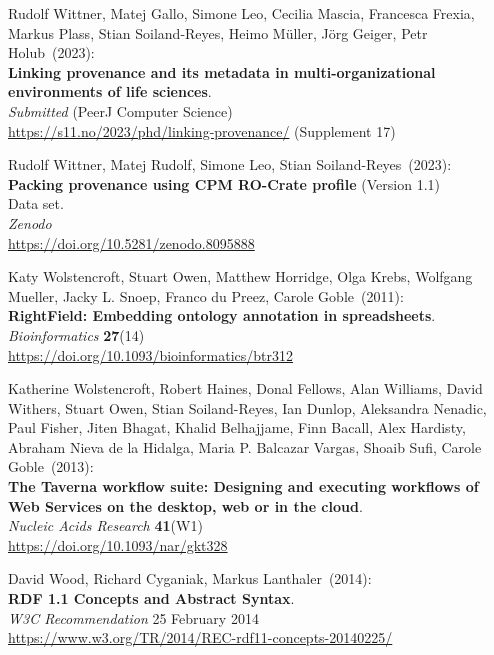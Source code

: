 \begin{thebibliography}{9}
Rudolf Wittner, Matej Gallo, Simone Leo, Cecilia Mascia, Francesca Frexia, Markus Plass, Stian Soiland-Reyes, Heimo Müller, Jörg Geiger, Petr Holub~(2023): \\
\textbf{Linking provenance and its metadata in multi-organizational environments of life sciences}.\\
\emph{Submitted} (PeerJ Computer Science)\\
\url{https://s11.no/2023/phd/linking-provenance/}
(Supplement 17)

Rudolf Wittner, Matej Rudolf, Simone Leo, Stian Soiland-Reyes~(2023): \\
\textbf{Packing provenance using CPM RO-Crate profile} (Version 1.1)\\
Data set.\\
\emph{Zenodo}\\
\url{https://doi.org/10.5281/zenodo.8095888}

Katy Wolstencroft, Stuart Owen, Matthew Horridge, Olga Krebs, Wolfgang Mueller, Jacky L. Snoep, Franco du Preez, Carole Goble~(2011): \\
\textbf{RightField: Embedding ontology annotation in spreadsheets}. \\
\emph{Bioinformatics} \textbf{27}(14) \\
\url{https://doi.org/10.1093/bioinformatics/btr312}

Katherine Wolstencroft, Robert Haines, Donal Fellows, Alan Williams, David Withers, Stuart Owen, Stian Soiland-Reyes, Ian Dunlop, Aleksandra Nenadic, Paul Fisher, Jiten Bhagat, Khalid Belhajjame, Finn Bacall, Alex Hardisty, Abraham Nieva de la Hidalga, Maria P. Balcazar Vargas, Shoaib Sufi, Carole Goble~(2013): \\
\textbf{The {Taverna} workflow suite: Designing
and executing workflows of {Web Services} on the desktop, web or in the
cloud}. \\
\emph{Nucleic Acids Research} \textbf{41}(W1) \\
\url{https://doi.org/10.1093/nar/gkt328}

David Wood, Richard Cyganiak, Markus Lanthaler~(2014): \\
\textbf{RDF 1.1 Concepts and Abstract Syntax}.\\
\emph{W3C Recommendation} 25 February 2014\\
\url{https://www.w3.org/TR/2014/REC-rdf11-concepts-20140225/}


\end{thebibliography}
